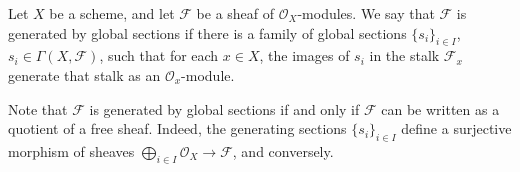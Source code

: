 Let $X$ be a scheme, and let $\mathcal{F}$ be a sheaf of $\mathcal{O}_X$-modules. We say that $\mathcal{F}$ is generated by global sections if there is a family of global sections $\{s_i\}_{i \in I}$, $s_i \in \Gamma(X, \mathcal{F})$, such that for each $x \in X$, the images of $s_i$ in the stalk $\mathcal{F}_x$ generate that stalk as an $\mathcal{O}_x$-module.

Note that $\mathcal{F}$ is generated by global sections if and only if $\mathcal{F}$ can be written as a quotient of a free sheaf. Indeed, the generating sections $\{s_i\}_{i \in I}$ define a surjective morphism of sheaves $\bigoplus_{i \in I} \mathcal{O}_X \rightarrow \mathcal{F}$, and conversely.
